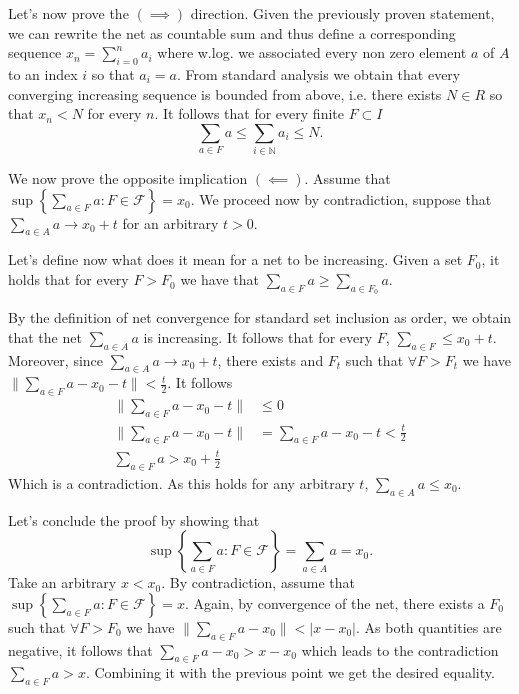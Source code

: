 \documentclass[a4paper,12pt]{article} %
\begin{document}
Let's now prove the \((\implies) \) direction.
Given the previously proven statement, we can rewrite the net as countable sum and thus define a corresponding sequence \(x_n = \sum_{i=0}^n a_{i}  \) where w.log. we associated every non zero element \(a\)  of \(A\) to an index \(i\) so that \(a_i = a\).
From standard analysis we obtain that every converging increasing sequence is bounded from above, i.e. there exists \(N \in  R\) so that \(x_n < N\) for every \(n\).
It follows that for every finite \(F \subset I\)
\begin{equation}
    \sum_{a \in F} a \leq \sum_{i \in  \mathbb{N}}a_i \leq N.
\end{equation}


We now prove the opposite implication \((\impliedby)\). Assume that \(\sup \left\{ \sum_{a \in F} a : F \in \mathcal{F} \right\} = x_0\). We proceed now by contradiction, suppose that \(\sum_{a \in  A}a \to  x_0 +t \) for an arbitrary \(t>0\).


Let's define now what does it mean for a net to be increasing. Given a set \(F_0\), it holds that for every \(F > F_0\) we have that \(\sum_{a\in  F}a \geq  \sum_{a \in  F_0}a  \).

By the definition of net convergence for standard set inclusion as order, we obtain that the net \(\sum_{a\in  A}a \) is increasing.
It follows that for every \(F\), \(\sum_{a \in  F} \leq  x_0 +t \). Moreover, since \(\sum_{a \in  A} a \to x_{0}+t  \), there exists and \(F_t\)  such that \(\forall F > F_t\) we have \(\| \sum_{a \in  F} a -x_{0}-t   \| < \frac{t}{2} \). It follows
\begin{align*}
    \| \sum_{a \in  F} a -x_0 -t  \| & \leq 0                                   \\
    \| \sum_{a \in  F} a -x_0 -t  \| & =  \sum_{a \in  F} a -x_0 -t<\frac{t}{2} \\
    \sum_{a \in  F}a > x_0 +\frac{t}{2}
\end{align*}
Which is a contradiction. As this holds for any arbitrary \(t\), \(\sum_{a\in A}a \leq x_0 \).


Let's conclude the proof by showing that
\begin{equation}
    \sup \left\{ \sum_{a \in F} a : F \in \mathcal{F} \right\} = \sum_{a \in  A} a = x_0.
\end{equation}
Take an arbitrary \(x<x_0\). By contradiction, assume that \(\sup \left\{ \sum_{a \in F} a : F \in \mathcal{F} \right\} = x\).
Again, by convergence of the net, there exists a \(F_0\) such that \(\forall F>F_0\) we have \(    \| \sum_{a \in F}a -x_0  \|  <|x-x_0|\). As both quantities are negative, it follows that
\(    \sum_{a \in  F} a- x_0 > x-x_0\) which leads to the contradiction \(\sum_{a \in  F} a > x \).
Combining it with the previous point we get the desired equality.
\end{document}
